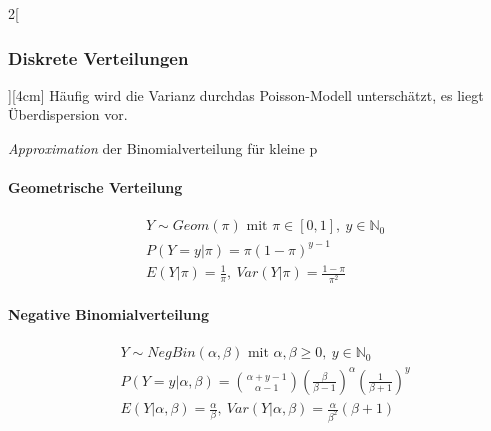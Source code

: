 \documentclass[8pt]{extarticle}
\begin{document}
\begin{multicols}{2}[\subsubsection{Diskrete Verteilungen}][4cm]
\noindent Häufig wird die Varianz durchdas Poisson-Modell unterschätzt, es liegt Überdispersion vor.
  
\noindent  \textit{Approximation} der Binomialverteilung für kleine p

  
    \paragraph{Geometrische Verteilung}

  \begin{align*}
    & Y \sim Geom(\pi) \text{ mit } \pi \in \left[0,1\right] ,\: y \in \mathbb{N}_0 \\
    & P(Y=y|\pi) = \pi(1-\pi)^{y-1} \\
    & E(Y|\pi) = \frac{1}{\pi} ,\: Var(Y|\pi) = \frac{1-\pi}{\pi^2}
  \end{align*}
  
    \paragraph{Negative Binomialverteilung}

  \begin{align*}
    & Y \sim NegBin(\alpha, \beta) \text{ mit } \alpha, \beta \geq 0 ,\: y \in \mathbb{N}_0 \\
    & P(Y=y|\alpha, \beta) = \binom{\alpha + y - 1}{\alpha - 1} \left(\frac{\beta}{\beta - 1}\right)^{\alpha} \left(\frac{1}{\beta + 1}\right)^y \\
    & E(Y|\alpha,\beta) = \frac{\alpha}{\beta} ,\: Var(Y|\alpha,\beta) = \frac{\alpha}{\beta^2}(\beta+1)
  \end{align*}

\end{multicols}
\end{document}
